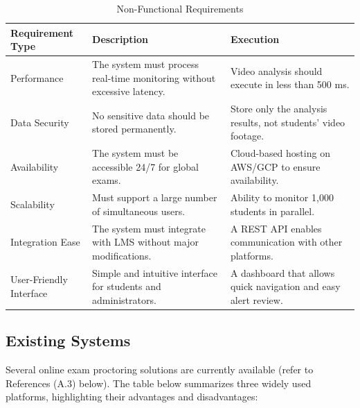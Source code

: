 \documentclass[12pt,a4paper]{article}
\begin{document}
\begin{table}[H]
    \centering
    \renewcommand{\arraystretch}{1.5}
    \begin{tabular}{| p{4cm} | p{6cm} | p{6cm} |}
        \hline
        \textbf{Requirement Type} & \textbf{Description} & \textbf{Execution} \\
        \hline
        Performance & The system must process real-time monitoring without excessive latency. & Video analysis should execute in less than 500 ms. \\
        \hline
        Data Security & No sensitive data should be stored permanently. & Store only the analysis results, not students' video footage. \\
        \hline
        Availability & The system must be accessible 24/7 for global exams. & Cloud-based hosting on AWS/GCP to ensure availability. \\
        \hline
        Scalability & Must support a large number of simultaneous users. & Ability to monitor 1,000 students in parallel. \\
        \hline
        Integration Ease & The system must integrate with LMS without major modifications. & A REST API enables communication with other platforms. \\
        \hline
        User-Friendly Interface & Simple and intuitive interface for students and administrators. & A dashboard that allows quick navigation and easy alert review. \\
        \hline
    \end{tabular}
    \caption{Non-Functional Requirements}
\end{table}

\subsection{Existing Systems}

Several online exam proctoring solutions are currently available (refer to References (A.3) below). The table below summarizes three widely used platforms, highlighting their advantages and disadvantages:
\end{document}
